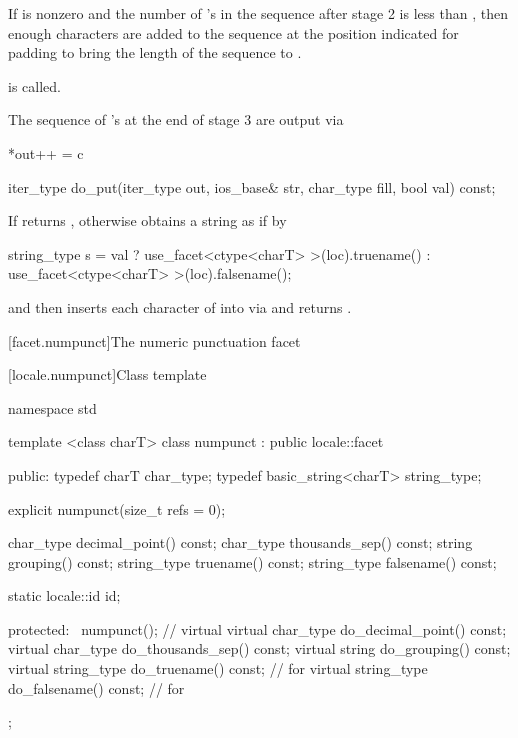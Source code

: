 \begin{itemdescr}
\begin{description}
If
is nonzero and the number of
's
in the sequence after stage 2 is less than
,
then enough  characters are added to the sequence at the position
indicated for padding to bring the length of the sequence to
.
 
is called.

The sequence of
's
at the end of stage 3 are output via

\begin{codeblock}
*out++ = c
\end{codeblock}
\end{description}
\end{itemdescr}

%
%
\begin{itemdecl}
iter_type do_put(iter_type out, ios_base& str, char_type fill,
                 bool val) const;
\end{itemdecl}

\begin{itemdescr}
\pnum
\returns
If
returns
,
otherwise obtains a string
as if by
\begin{codeblock}
string_type s =
  val ? use_facet<ctype<charT> >(loc).truename()
    : use_facet<ctype<charT> >(loc).falsename();
\end{codeblock}
and then inserts each character
of
into
via
and returns
.
\end{itemdescr}

[facet.numpunct]{The numeric punctuation facet}

[locale.numpunct]{Class template }

%
\begin{codeblock}
namespace std {
  template <class charT>
  class numpunct : public locale::facet {
  public:
    typedef charT               char_type;
    typedef basic_string<charT> string_type;

    explicit numpunct(size_t refs = 0);

    char_type    decimal_point()   const;
    char_type    thousands_sep()   const;
    string       grouping()        const;
    string_type  truename()        const;
    string_type  falsename()       const;

    static locale::id id;

  protected:
   ~numpunct();                 // virtual
    virtual char_type    do_decimal_point() const;
    virtual char_type    do_thousands_sep() const;
    virtual string       do_grouping()      const;
    virtual string_type  do_truename()      const;      // for 
    virtual string_type  do_falsename()     const;      // for 
  };
}
\end{codeblock}

